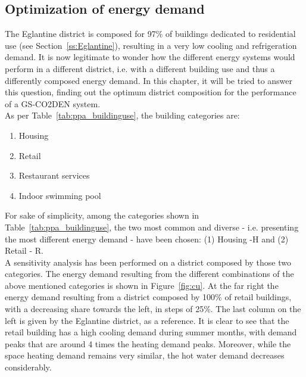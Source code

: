 \documentclass{article}
\begin{document}
\subsection{Optimization of energy demand}

The Eglantine district is composed for 97\% of buildings dedicated to residential use (see Section~\ref{ss:Eglantine}), resulting in a very low cooling and refrigeration demand. It is now legitimate to wonder how the different energy systems would perform in a different district, i.e. with a different building use and thus a differently composed energy demand. In this chapter, it will be tried to answer this question, finding out the optimum district composition for the performance of a GS-CO2DEN system.\\

As per Table~\ref{tab:ppa_buildinguse}, the building categories are:
\begin{enumerate}
	\item Housing
	\item Retail
	\item Restaurant services
	\item Indoor swimming pool
\end{enumerate}
For sake of simplicity, among the categories shown in Table~\ref{tab:ppa_buildinguse}, the two most common and diverse - i.e. presenting the most different energy demand - have been chosen: (1) Housing -H and (2) Retail - R. \\

A sensitivity analysis has been performed on a district composed by those two categories. The energy demand resulting from the different combinations of the above mentioned categories is shown in Figure~\ref{fig:cu}. At the far right the energy demand resulting from a district composed by 100\% of retail buildings, with a decreasing share towards the left, in steps of 25\%. The last column on the left is given by the Eglantine district, as a reference. It is clear to see that the retail building has a high cooling demand during summer months, with demand peaks that are around 4 times the heating demand peaks. Moreover, while the space heating demand remains very similar, the hot water demand decreases considerably.


\end{document}
